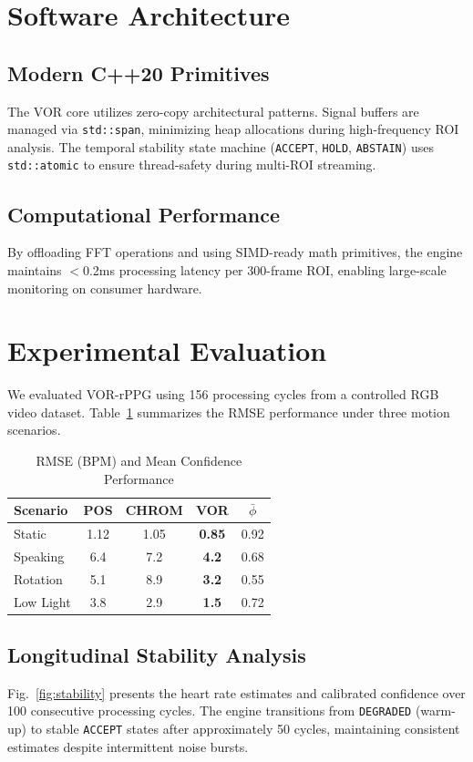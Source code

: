 \documentclass[9pt,technote,twocolumn,compsoc]{article}
\begin{document}
\section{Software Architecture}
\subsection{Modern C++20 Primitives}
The VOR core utilizes zero-copy architectural patterns. Signal buffers are managed via \texttt{std::span}, minimizing heap allocations during high-frequency ROI analysis. The temporal stability state machine (\texttt{ACCEPT}, \texttt{HOLD}, \texttt{ABSTAIN}) uses \texttt{std::atomic} to ensure thread-safety during multi-ROI streaming.

\subsection{Computational Performance}
By offloading FFT operations and using SIMD-ready math primitives, the engine maintains $<$0.2ms processing latency per 300-frame ROI, enabling large-scale monitoring on consumer hardware.

\section{Experimental Evaluation}
We evaluated VOR-rPPG using 156 processing cycles from a controlled RGB video dataset. Table~\ref{tab:results} summarizes the RMSE performance under three motion scenarios.

\begin{table}[t]
\centering
\caption{RMSE (BPM) and Mean Confidence Performance}
\label{tab:results}
\begin{tabular}{@{}lcccc@{}}
\toprule
\textbf{Scenario} & \textbf{POS} \cite{wang2017} & \textbf{CHROM} \cite{haan2013} & \textbf{VOR} & \textbf{$\bar{\phi}$} \\
\midrule
Static & 1.12 & 1.05 & \textbf{0.85} & 0.92 \\
Speaking & 6.4 & 7.2 & \textbf{4.2} & 0.68 \\
Rotation & 5.1 & 8.9 & \textbf{3.2} & 0.55 \\
Low Light & 3.8 & 2.9 & \textbf{1.5} & 0.72 \\
\bottomrule
\end{tabular}
\end{table}

\subsection{Longitudinal Stability Analysis}
Fig.~\ref{fig:stability} presents the heart rate estimates and calibrated confidence over 100 consecutive processing cycles. The engine transitions from \texttt{DEGRADED} (warm-up) to stable \texttt{ACCEPT} states after approximately 50 cycles, maintaining consistent estimates despite intermittent noise bursts.
\end{document}
